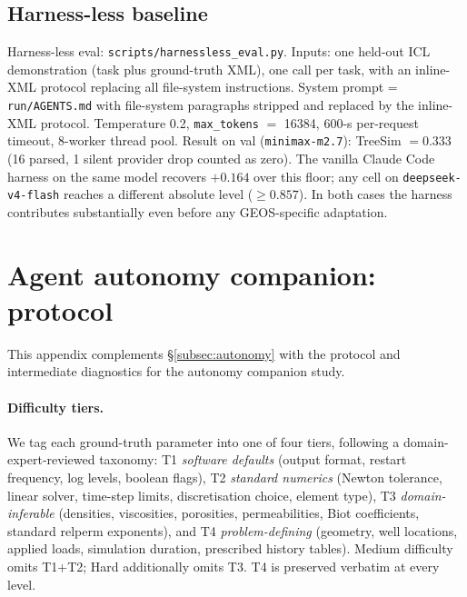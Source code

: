\documentclass{article}
\begin{document}
\subsection{Harness-less baseline}
\label{subsec:harnessless}
Harness-less eval: \texttt{scripts/harnessless\_eval.py}. Inputs: one held-out ICL demonstration (task plus ground-truth XML), one call per task, with an inline-XML protocol replacing all file-system instructions. System prompt = \texttt{run/AGENTS.md} with file-system paragraphs stripped and replaced by the inline-XML protocol. Temperature 0.2, \texttt{max\_tokens} $=$ 16384, 600-s per-request timeout, 8-worker thread pool. Result on val (\texttt{minimax-m2.7}): TreeSim $= 0.333$ (16 parsed, 1 silent provider drop counted as zero). The vanilla Claude Code harness on the same model recovers ${+}0.164$ over this floor; any cell on \texttt{deepseek-v4-flash} reaches a different absolute level ($\geq 0.857$). In both cases the harness contributes substantially even before any GEOS-specific adaptation.

\section{Agent autonomy companion: protocol}
\label{app:autonomy}

This appendix complements \S\ref{subsec:autonomy} with the protocol and intermediate diagnostics for the autonomy companion study.

\paragraph{Difficulty tiers.} We tag each ground-truth parameter into one of four tiers, following a domain-expert-reviewed taxonomy: T1 \emph{software defaults} (output format, restart frequency, log levels, boolean flags), T2 \emph{standard numerics} (Newton tolerance, linear solver, time-step limits, discretisation choice, element type), T3 \emph{domain-inferable} (densities, viscosities, porosities, permeabilities, Biot coefficients, standard relperm exponents), and T4 \emph{problem-defining} (geometry, well locations, applied loads, simulation duration, prescribed history tables). Medium difficulty omits T1+T2; Hard additionally omits T3. T4 is preserved verbatim at every level.
\end{document}

